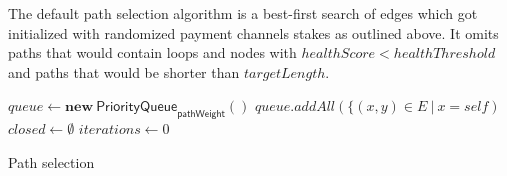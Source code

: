 The default path selection algorithm is a best-first search of edges which got initialized with randomized payment channels stakes as outlined above. It omits paths that would contain loops and nodes with $healthScore < healthThreshold$ and paths that would be shorter than $targetLength$.

\begin{algorithm}[H]
    \SetAlgoNoLine
    \DontPrintSemicolon
    \;
    $queue \leftarrow \mathbf{new} \ \mathsf{PriorityQueue}_{\textsf{pathWeight}}()$\;
    $queue.addAll(\{ (x,y) \in E \ | \ x = self)$\;
    $closed \leftarrow \emptyset$\;
    $iterations \leftarrow 0$\;
    \;
    \caption{Path selection}
\end{algorithm}
